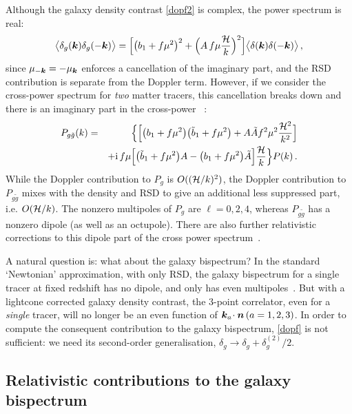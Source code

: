 Although the galaxy density contrast \eqref{dopf2} is complex, the power spectrum is real:
\begin{equation}
\big\langle \delta_g(\bm {k})\delta_g(-\bm {k})\big\rangle
=\Big[ \big(b_{1} + f\mu^{2}\big)^2+\Big(A\,f \mu{\mathcal{H}\over k}\Big)^2\Big] \big\langle \delta(\bm {k})\delta(-\bm {k})\big\rangle \,,\nonumber
\end{equation}
since $\mu_{-\bm {k}}=-\mu_{\bm {k}}$ enforces a cancellation of the imaginary part, and the RSD contribution is separate from the Doppler term.
  However, if we consider the cross-power spectrum for {\em two} matter tracers, this cancellation breaks down
and  there is an imaginary part in the cross-power~ \citep{McDonald:2009dh,Bonvin:2014owa}:
\begin{align}
P_{g \tilde g}(k)&=&\Big\{\Big[ \big(b_{1} + f\mu^{2}\big)\big(\tilde b_{1} + f\mu^{2}\big)+A\tilde A f^2\mu^2 {\mathcal{H}^2\over k^2 }\Big]\nonumber\\&&
+\mathrm{i\,} f\mu\Big[\big(\tilde b_{1} + f\mu^{2}\big)A-\big(b_{1} + f\mu^{2}\big)\tilde A\Big]{\mathcal{H}\over k} \Big\}P(k) \,.\nonumber
\end{align}
While the Doppler contribution to $P_g$ is $O((\mathcal{H}/k)^{2})$,  the Doppler contribution to $P_{g\tilde g}$ mixes with the density and RSD to give an additional less suppressed part, i.e. $O(\mathcal{H}/k)$. The nonzero multipoles of $P_g$ are $\ell=0,2,4$, whereas  $P_{g \tilde g}$ has a nonzero dipole (as well as an octupole).  There are also further relativistic corrections to this dipole part of the cross power spectrum~\citep{DiDio:2018zmk}.


A natural question is: what about the galaxy bispectrum? In the standard `Newtonian' approximation, with only RSD, the galaxy bispectrum for a single tracer at fixed redshift has no dipole, and only has even multipoles~\citep{Scoccimarro:1999ed,Nan:2017oaq}. But
with a lightcone corrected galaxy density contrast, the 3-point correlator, even for a {\em single} tracer, will no longer be an even function of $\bm {k}_a\!\cdot\bm {n} \,(a=1,2,3)$. In order to compute the consequent contribution to the galaxy bispectrum, \eqref{dopf} is not sufficient: we need its second-order generalisation, $\delta_g \to \delta_g+\delta^{(2)}_g/2$.

\subsection*{Relativistic contributions to the galaxy bispectrum}

